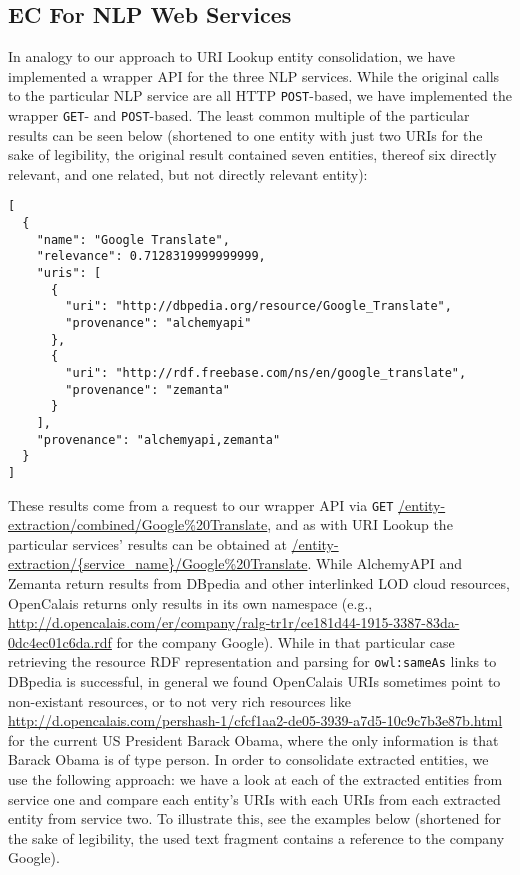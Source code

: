 \documentclass{acm_proc_article-sp}
\begin{document}
\subsection{EC For NLP Web Services}\label{sec:consolidation2}
In analogy to our approach to URI Lookup entity consolidation, we have implemented a wrapper API for the three NLP services. While the original calls to the particular NLP service are all HTTP \texttt{POST}-based, we have implemented the wrapper \texttt{GET}- and \texttt{POST}-based. The least common multiple of the particular results can be seen below (shortened to one entity with just two URIs for the sake of legibility, the original result contained seven entities, thereof six directly relevant, and one related, but not directly relevant entity):
\begin{verbatim}
[ 
  {
    "name": "Google Translate",
    "relevance": 0.7128319999999999,
    "uris": [
      {
        "uri": "http://dbpedia.org/resource/Google_Translate",
        "provenance": "alchemyapi"
      },
      {
        "uri": "http://rdf.freebase.com/ns/en/google_translate",
        "provenance": "zemanta"
      }
    ],
    "provenance": "alchemyapi,zemanta"
  }
]
\end{verbatim}
These results come from a request to our wrapper API via \texttt{GET} \url{/entity-extraction/combined/Google%20Translate}, and as with URI Lookup the particular services' results can be obtained at \url{/entity-extraction/{service_name}/Google%
\end{document}
